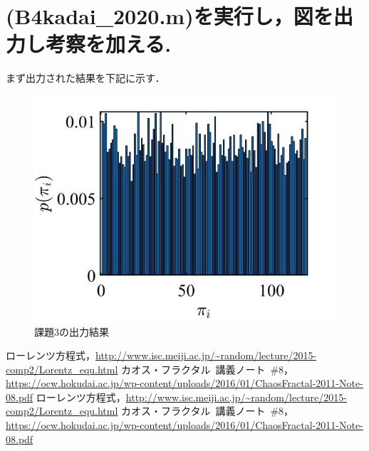 \documentclass[autodetect-engine,dvipdfmx-if-dvi,ja=standard,a4paper,11pt]{bxjsarticle} %
\begin{document}
\section{(B4kadai\_2020.m)を実行し，図を出力し考察を加える.}
まず出力された結果を下記に示す．

\begin{figure}[H]%
\begin{center}
\includegraphics[width=.4\textwidth]{kadai3_rusult.jpg}
\end{center}
\caption{課題3の出力結果}%
\label{fig:kadai3}
\end{figure}












\begin{thebibliography}{9999}%
ローレンツ方程式，\url{http://www.isc.meiji.ac.jp/~random/lecture/2015-comp2/Lorentz_equ.html}
カオス・フラクタル\ 講義ノート\ \#8，\url{https://ocw.hokudai.ac.jp/wp-content/uploads/2016/01/ChaosFractal-2011-Note-08.pdf}
ローレンツ方程式，\url{http://www.isc.meiji.ac.jp/~random/lecture/2015-comp2/Lorentz_equ.html}
カオス・フラクタル\ 講義ノート\ \#8，\url{https://ocw.hokudai.ac.jp/wp-content/uploads/2016/01/ChaosFractal-2011-Note-08.pdf}

\end{thebibliography}

\end{document}
